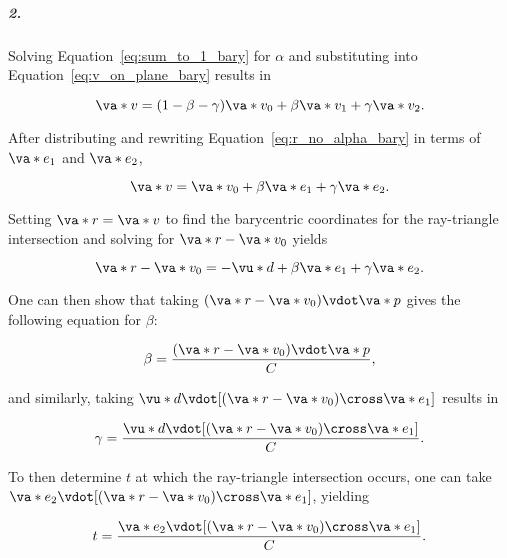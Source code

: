 \subparagraph{2.}
Solving Equation~\ref{eq:sum_to_1_bary} for $\alpha$ and substituting into Equation~\ref{eq:v_on_plane_bary} results in

\begin{equation}
 \va*{v} = (1 - \beta - \gamma)\va*{v_0} + \beta\va*{v_1} + \gamma\va*{v_2}.
 \label{eq:r_no_alpha_bary}
\end{equation}

\noindent After distributing and rewriting Equation~\ref{eq:r_no_alpha_bary} in terms of $\va*{e_1}$ and $\va*{e_2}$, 

\begin{equation}
  \va*{v} = \va*{v_0} + \beta \va*{e_1} + \gamma \va*{e_2}.
  \label{eq:r_no_alpha_bary_simp}
\end{equation}

\noindent Setting $\va*{r} = \va*{v}$ to find the barycentric coordinates for the ray-triangle intersection and solving for $\va*{r} - \va*{v_0}$ yields

\begin{equation}
  \va*{r} - \va*{v_0} = -\vu*{d} + \beta \va*{e_1} + \gamma \va*{e_2}.
\end{equation}

\noindent One can then show that taking $(\va*{r} - \va*{v_0}) \vdot \va*{p}$ gives the following equation for $\beta$:

\begin{equation}
  \beta = \frac{(\va*{r} - \va*{v_0}) \vdot \va*{p}}{C},
  \label{eq:beta_bary}
\end{equation}

\noindent and similarly, taking $\vu*{d} \vdot [(\va*{r} - \va*{v_0}) \cross \va*{e_1}]$ results in

\begin{equation}
  \gamma = \frac{\vu*{d} \vdot [(\va*{r} - \va*{v_0}) \cross \va*{e_1}]}{C}.
  \label{eq:gamma_bary}
\end{equation}

\noindent To then determine $t$ at which the ray-triangle intersection occurs, one can take $\va*{e_2} \vdot [(\va*{r} - \va*{v_0}) \cross \va*{e_1}]$, yielding

\begin{equation}
  t = \frac{\va*{e_2} \vdot [(\va*{r} - \va*{v_0}) \cross \va*{e_1}]}{C}.
  \label{eq:t_bary}
\end{equation}

